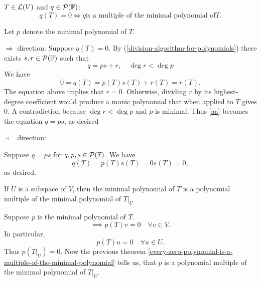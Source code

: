 \setcounter{thm}{28}
\begin{thm}
  \label{thm:every-zero-polynomial-is-a-multiple-of-the-minimal-polynomial}
  $T\in \mathcal{L}(V)$ and $q \in \mathcal{P} (\mathbb{F})$: 
  \begin{equation}
    q(T)=0 \iff q \text{is a multiple of the minimal polynomial of} T.
  \end{equation}
\end{thm}
\begin{prf}
  Let $p$ denote the minimal polynomial of $T$.

	\begin{description}
  
  \item{$\Rightarrow$ direction:}{
			Suppose $q(T)=0$.
			By (\ref{division-algorithm-for-polynomials}) there exists $s,r \in \mathcal{P} (\mathbb{F})$ such that
			\begin{equation}
				q=ps+r, \quad \deg r < \deg p
			\end{equation}
			We have
			\begin{equation}
				\label{aa}
				0 = q(T) = p(T)s(T) + r(T) = r(T).
			\end{equation}
			The equation above implies that $r=0$. Otherwise, dividing $r$ by its highest-degree coefficient would produce a monic polynomial that when applied to $T$ gives $0$. A contradiction because $\deg r < \deg p$ and $p$ is minimal. Thus \ref{aa} becomes the equation $q=ps$, as desired
		}
		\item{$\Leftarrow$ direction:}{
			Suppose $q=ps$ for $q,p,s \in \mathcal{P}(\mathbb{F})$. We have
			\begin{equation}
				q(T) = p(T)s(T)=0s(T)=0,
			\end{equation}
			as desired. 
      
		}
	\end{description}
  
\end{prf}

\setcounter{thm}{30}
\begin{thm}
  \label{thm: minimal polynomial of a restriction operator}
  If $U$ is a subspace of $V$, then the minimal polynomial of $T$ is a polynomial multiple of the minimal polynomial of $\left .T \right | _{ U}$
\end{thm}
\begin{prf}
  Suppose $p$ is the minimal polynomial of $T$.
  \begin{equation}
    \implies p(T)v=0 \quad \forall v \in V.
  \end{equation}
  In particular,
  \begin{equation}
    p(T)u=0 \quad \forall u\in U.
  \end{equation} Thus $p\left( \left.T\right|_{U} \right)=0.$ Now the previous theorem
  \ref{every-zero-polynomial-is-a-multiple-of-the-minimal-polynomial} tells us, that $p$ is a polynomial multiple of the minimal polynomial of $\left. T \right |_U$.
  
\end{prf}

